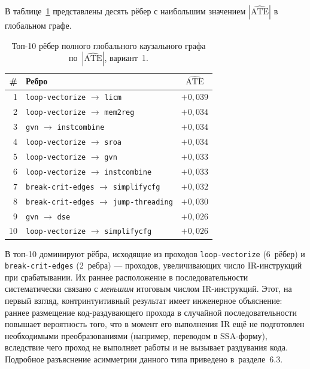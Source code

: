В таблице~\ref{tab:top10_global} представлены десять рёбер с наибольшим значением $|\widehat{\text{ATE}}|$ в глобальном графе.

\begin{table}[h]
\centering
\caption{Топ-10 рёбер полного глобального каузального графа по~$|\widehat{\text{ATE}}|$, вариант~1.}
\label{tab:top10_global}
\begin{tabular}{rlc}
\hline
\# & Ребро & $\widehat{\text{ATE}}$ \\
\hline
1  & \texttt{loop-\allowbreak vectorize} $\to$ \texttt{licm}              & $+0{,}039$ \\
2  & \texttt{loop-\allowbreak vectorize} $\to$ \texttt{mem2reg}           & $+0{,}034$ \\
3  & \texttt{gvn} $\to$ \texttt{instcombine}                              & $+0{,}034$ \\
4  & \texttt{loop-\allowbreak vectorize} $\to$ \texttt{sroa}              & $+0{,}034$ \\
5  & \texttt{loop-\allowbreak vectorize} $\to$ \texttt{gvn}               & $+0{,}033$ \\
6  & \texttt{loop-\allowbreak vectorize} $\to$ \texttt{instcombine}       & $+0{,}033$ \\
7  & \texttt{break-\allowbreak crit-\allowbreak edges} $\to$ \texttt{simplifycfg}    & $+0{,}032$ \\
8  & \texttt{break-\allowbreak crit-\allowbreak edges} $\to$ \texttt{jump-\allowbreak threading} & $+0{,}030$ \\
9  & \texttt{gvn} $\to$ \texttt{dse}                                      & $+0{,}026$ \\
10 & \texttt{loop-\allowbreak vectorize} $\to$ \texttt{simplifycfg}       & $+0{,}026$ \\
\hline
\end{tabular}
\end{table}

В топ-10 доминируют рёбра, исходящие из проходов \texttt{loop-\allowbreak vectorize} (6~рёбер) и \texttt{break-\allowbreak crit-\allowbreak edges} (2~ребра) --- проходов, увеличивающих число IR-инструкций при срабатывании. Их раннее расположение в последовательности систематически связано с \emph{меньшим} итоговым числом IR-инструкций. Этот, на первый взгляд, контринтуитивный результат имеет инженерное объяснение: раннее размещение код-раздувающего прохода в случайной последовательности повышает вероятность того, что в момент его выполнения IR ещё не подготовлен необходимыми преобразованиями (например, переводом в SSA-форму), вследствие чего проход не выполняет работы и не вызывает раздувания кода. Подробное разъяснение асимметрии данного типа приведено в~разделе~6.3.

